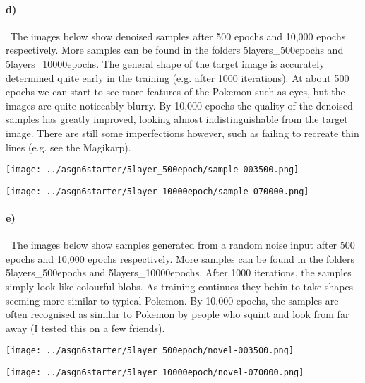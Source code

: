 \documentclass[a4paper,12pt]{article}
\begin{document}
\paragraph{d)}
\
The images below show denoised samples after 500 epochs and 10,000 epochs respectively. More samples can be found in the folders 5layers\_500epochs and 5layers\_10000epochs. The general shape of the target image is accurately determined quite early in the training (e.g. after 1000 iterations). At about 500 epochs we can start to see more features of the Pokemon such as eyes, but the images are quite noticeably blurry. By 10,000 epochs the quality of the denoised samples has greatly improved, looking almost indistinguishable from the target image. There are still some imperfections however, such as failing to recreate thin lines (e.g. see the Magikarp). 
\begin{center}
 \texttt{[image: ../asgn6starter/5layer\_500epoch/sample-003500.png]}
\end{center}
\begin{center}
 \texttt{[image: ../asgn6starter/5layer\_10000epoch/sample-070000.png]}
\end{center}

\paragraph{e)}
\
The images below show samples generated from a random noise input after 500 epochs and 10,000 epochs respectively. More samples can be found in the folders 5layers\_500epochs and 5layers\_10000epochs. After 1000 iterations, the samples simply look like colourful blobs. As training continues they behin to take shapes seeming more similar to typical Pokemon. By 10,000 epochs, the samples are often recognised as similar to Pokemon by people who squint and look from far away (I tested this on a few friends). 
\begin{center}
 \texttt{[image: ../asgn6starter/5layer\_500epoch/novel-003500.png]}
\end{center}
\begin{center}
 \texttt{[image: ../asgn6starter/5layer\_10000epoch/novel-070000.png]}
\end{center}
\end{document}
